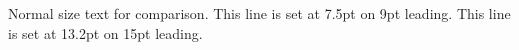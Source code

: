 \documentclass{article}
\begin{document}
Normal size text for comparison.
{\fontsize{7.5}{9}\selectfont This line is set at 7.5pt on 9pt leading.}
{\fontsize{13.2}{15}\selectfont This line is set at 13.2pt on 15pt leading.}
\end{document}
